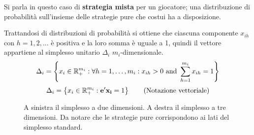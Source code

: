 Si parla in questo caso di \textbf{strategia mista} per un giocatore; una distribuzione di probabilità sull'insieme delle strategie pure che costui ha a disposizione.

\newpage

Trattandosi di distribuzioni di probabilità si ottiene che ciascuna componente $x_{ih}$ con $h = {1,2,...}$ è positiva e la loro somma è uguale a 1, quindi il vettore appartiene al simplesso unitario $\Delta_i$ $m_i$-dimensionale.
\begin{align}
	\Delta_i = \left\{ x_i \in \mathbb{R}^{m_i}_+ : \forall h = 1, \dots, m_i : x_{ih} > 0 \text{ and } \sum_{h=1}^{m_i} x_{ih} = 1 \right\}
\end{align}
\begin{align*}
	\Delta_i = \left\{ x_i \in \mathbb{R}^{m_i}_+ : \mathbf{e}'\mathbf{x_i} = 1 \right\} \tag{Notazione vettoriale}
\end{align*}


\begin{figure}[h!]
	\centering
	\qquad\qquad
	\caption{A sinistra il simplesso a due dimensioni. A destra il simplesso a tre dimensioni. Da notare che le strategie pure corrispondono ai lati del simplesso standard.}
\end{figure}

